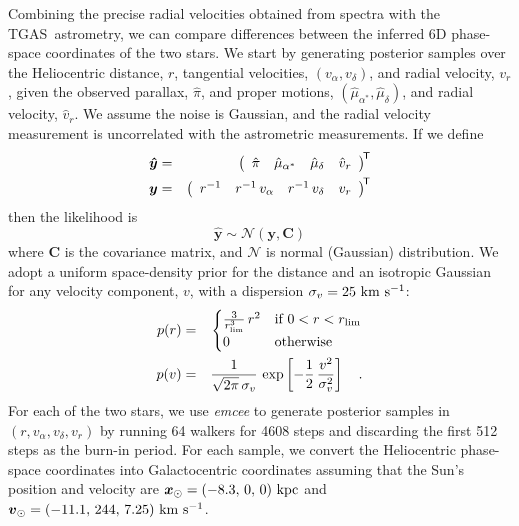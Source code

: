 \documentclass[12pt,letterpaper,margin=1in]{article}
\newcommand{\project}[1]{\textsl{#1}}
\newcommand{\acronym}[1]{{\small{#1}}}
\newcommand{\tgas}{\acronym{TGAS}}
\newcommand{\transp}[1]{{#1}^{\!\mathsf{T}}}
\newcommand{\bs}[1]{\boldsymbol{#1}}
\newcommand{\mat}[1]{\mathbf{#1}}
\renewcommand{\vec}[1]{\bs{#1}}
\newcommand{\kms}{\ensuremath{\rm km~s^{-1}}}
\begin{document}
Combining the precise radial velocities obtained from spectra with the \tgas\
astrometry, we can compare differences between the inferred 6D phase-space
coordinates of the two stars.
We start by generating posterior samples over the Heliocentric distance, $r$,
tangential velocities, $(v_\alpha, v_\delta)$, and radial velocity, $v_r$,
given the observed parallax, $\hat\pi$, and proper motions,
$(\hat\mu_{\alpha^*}, \hat\mu_\delta)$, and radial velocity, $\hat v_r$.
We assume the noise is Gaussian, and the radial velocity measurement is
uncorrelated with the astrometric measurements.
If we define
\begin{eqnarray}
  \vec{\hat y} &=&
      \transp{\left(
        \begin{array}{c@{\hspace{1em}} c@{\hspace{1em}} c@{\hspace{1em}} c}
          \hat\pi &
          \hat\mu_{\alpha^*} &
          \hat\mu_\delta &
          \hat v_r
        \end{array}
      \right)}\\
  \vec{y} &=&
      \transp{\left(
        \begin{array}{c@{\hspace{1em}} c@{\hspace{1em}} c@{\hspace{1em}} c}
          r^{-1} &
          r^{-1}\,v_\alpha &
          r^{-1}\,v_\delta &
          v_r
        \end{array}
      \right)}
\end{eqnarray}
then the likelihood is
\begin{equation}
  \vec{\hat y} \sim \mathcal{N}(\vec{y}, \mat{C})
\end{equation} where $\mat{C}$ is the covariance matrix, and $\mathcal{N}$ is
normal (Gaussian) distribution\cite{2017AJ....153..257O}.
We adopt a uniform space-density prior for the distance and an isotropic
Gaussian for any velocity component, $v$, with a dispersion $\sigma_v=25~\kms$:
\begin{eqnarray}
p(r) &=&
  \begin{cases}
    \frac{3}{r_{\rm lim}^3} \, r^2 & \text{if } 0 < r < r_{\rm lim}\\
    0              & \text{otherwise}
  \end{cases}\\
p(v) &=& \frac{1}{\sqrt{2\pi}\,\sigma_v} \,
  \exp\left[-\frac{1}{2} \, \frac{v^2}{\sigma_v^2} \right] \quad .
\end{eqnarray}
%
For each of the two stars, we use \project{emcee}\cite{2013PASP..125..306F}
to generate posterior samples in $(r, v_\alpha, v_\delta, v_r)$
by running 64 walkers for 4608 steps and discarding the first
512 steps as the burn-in period.
For each sample, we convert the Heliocentric phase-space coordinates into
Galactocentric coordinates assuming that the Sun's position and velocity are
$\vec x_\odot = (-8.3,\,0,\,0)~{\rm kpc}$ and $\vec v_\odot =
(-11.1,\,244,\,7.25)~\kms$\cite{Schonrich:2010, Schonrich:2012}.
\end{document}
